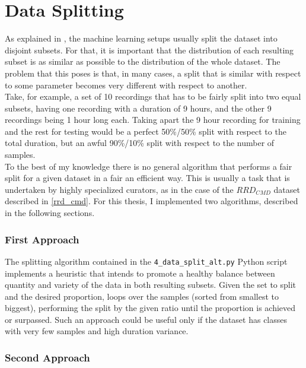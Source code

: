   \section{Data Splitting} \label{datasplit}

  As explained in \label{crossvalidation}, the machine learning setups usually split the dataset into disjoint subsets. For that, it is important that the distribution of each resulting subset is as similar as possible to the distribution of the whole dataset. The problem that this poses is that, in many cases, a split that is similar with respect to some parameter becomes very different with respect to another.\\

  Take, for example, a set of 10 recordings that has to be fairly split into two equal subsets, having one recording with a duration of 9 hours, and the other 9 recordings being 1 hour long each. Taking apart the 9 hour recording for training and the rest for testing would be a perfect 50\%/50\% split with respect to the total duration, but an awful 90\%/10\% split with respect to the number of samples.\\

  To the best of my knowledge there is no general algorithm that performs a fair split for a given dataset in a fair an efficient way. This is usually a task that is undertaken by highly specialized curators, as in the case of the \(RRD_{CMD}\) dataset described in \ref{rrd_cmd}. For this thesis, I implemented two algorithms, described in the following sections.

  \subsubsection{First Approach}
  The splitting algorithm contained in the \texttt{4\_data\_split\_alt.py} Python script implements a heuristic that intends to promote a healthy balance between quantity and variety of the data in both resulting subsets. Given the set to split and the desired proportion, loops over the samples (sorted from smallest to biggest), performing the split by the given ratio until the proportion is achieved or surpassed. Such an approach could be useful only if the dataset has classes with very few samples and high duration variance.

  \subsubsection{Second Approach}


